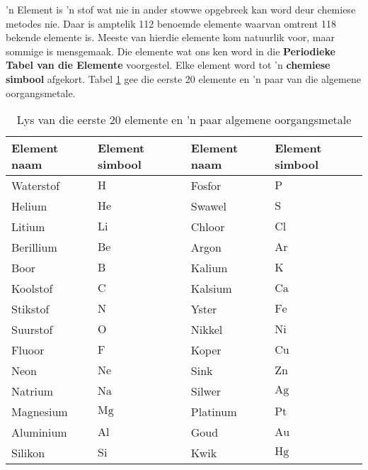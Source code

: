 \label{m38708*fhsst!!!underscore!!!id193}
{ \label{m38708*meaningfhsst!!!underscore!!!id193}
 'n Element is 'n stof wat nie in ander stowwe opgebreek kan word deur chemiese metodes nie.} 
        \label{m38708*id63334}Daar is amptelik 112 benoemde elemente waarvan omtrent 118 bekende elemente is. Meeste van hierdie elemente kom natuurlik voor, maar sommige is mensgemaak. Die elemente wat ons ken word in die \textbf{Periodieke Tabel van die Elemente} voorgestel. Elke element word tot 'n \textbf{chemiese simbool} afgekort. Tabel \ref{tab:elements} gee die eerste 20 elemente en 'n paar van die algemene oorgangsmetale.\par \label{m38708*eip-775}
\begin{table}[H]
\label{tab:elements}
\begin{center}
\begin{tabular}{|l|l|l|l|}\hline
\textbf{Element naam} & \textbf{Element simbool} & \textbf{Element naam} & \textbf{Element simbool} \\ \hline
Waterstof & $\text{H}$ & Fosfor & $\text{P}$  \\ \hline
Helium & $\text{He}$ & Swawel & $\text{S}$ \\ \hline
Litium & $\text{Li}$ & Chloor & $\text{Cl}$ \\ \hline
Berillium & $\text{Be}$ & Argon & $\text{Ar}$ \\ \hline 
Boor & $\text{B}$ & Kalium & $\text{K}$ \\ \hline
Koolstof & $\text{C}$ & Kalsium & $\text{Ca}$ \\ \hline 
Stikstof & $\text{N}$ & Yster & $\text{Fe}$ \\ \hline
Suurstof & $\text{O}$ & Nikkel & $\text{Ni}$ \\ \hline 
Fluoor & $\text{F}$ & Koper & $\text{Cu}$ \\ \hline
Neon & $\text{Ne}$  & Sink & $\text{Zn}$ \\ \hline
Natrium & $\text{Na}$  & Silwer & $\text{Ag}$ \\ \hline
Magnesium & $\text{Mg}$  & Platinum & $\text{Pt}$ \\ \hline
Aluminium & $\text{Al}$ & Goud & $\text{Au}$ \\ \hline
Silikon & $\text{Si}$ & Kwik & $\text{Hg}$  \\ \hline
\end{tabular}
\end{center}
\caption{Lys van die eerste 20 elemente en 'n paar algemene oorgangsmetale}
\end{table}
\par 


